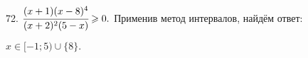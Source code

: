 72. $\cfrac{(x+1)(x-8)^4}{(x+2)^2(5-x)}\geqslant0.$ Применив метод интервалов, найдём ответ:
\begin{figure}[ht!]
\end{figure}
$x\in[-1;5)\cup\{8\}.$\\
